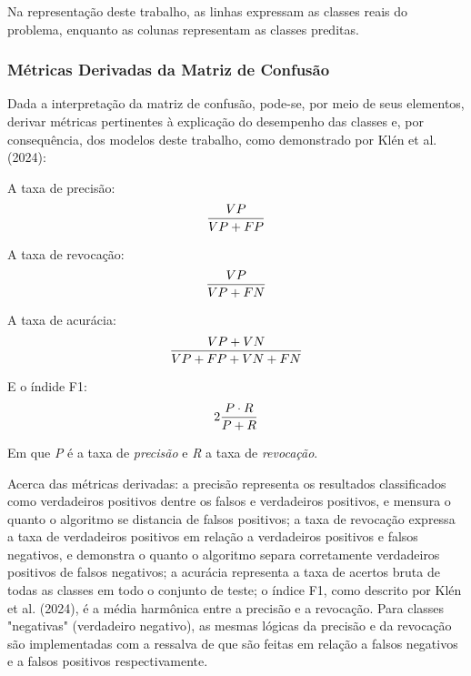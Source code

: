 \documentclass[english, spanish, brazilian]{RBIEarticle} %
\begin{document}
Na representação deste trabalho, as linhas expressam as classes reais do problema, enquanto as colunas representam as classes preditas.

\subsubsection{Métricas Derivadas da Matriz de Confusão}
Dada a interpretação da matriz de confusão, pode-se, por meio de seus elementos, derivar métricas pertinentes à explicação do desempenho das classes e, por consequência, dos modelos deste trabalho, como demonstrado por Klén et al. (2024):

\vspace{0.5cm}
A taxa de precisão:
\begin{equation}
    \large \frac{VP}{VP+FP}
\end{equation}
\vspace{0.5cm}

\vspace{0.5cm}
A taxa de revocação:
\begin{equation}
    \large \frac{VP}{VP+FN}
\end{equation}
\vspace{0.5cm}

\vspace{0.5cm}
A taxa de acurácia:
\begin{equation}
    \large \frac{VP+VN}{VP+FP+VN+FN}
\end{equation}
\vspace{0.5cm}

\vspace{0.5cm}
E o índide F1:
\begin{equation}
    \large 2 \frac{P \cdot R}{P+R}
\end{equation}
\vspace{0.5cm}

Em que \textit{P} é a taxa de \textit{precisão} e \textit{R} a taxa de \textit{revocação}.

Acerca das métricas derivadas: a precisão representa os resultados classificados como verdadeiros positivos dentre os falsos e verdadeiros positivos, e mensura o quanto o algoritmo se distancia de falsos positivos; a taxa de revocação expressa a taxa de verdadeiros positivos em relação a verdadeiros positivos e falsos negativos, e demonstra o quanto o algoritmo separa corretamente verdadeiros positivos de falsos negativos; a acurácia representa a taxa de acertos bruta de todas as classes em todo o conjunto de teste; o índice F1, como descrito por Klén et al. (2024), é a média harmônica entre a precisão e a revocação. Para classes "negativas" (verdadeiro negativo), as mesmas lógicas da precisão e da revocação são implementadas com a ressalva de que são feitas em relação a falsos negativos e a falsos positivos respectivamente. 
\end{document}
